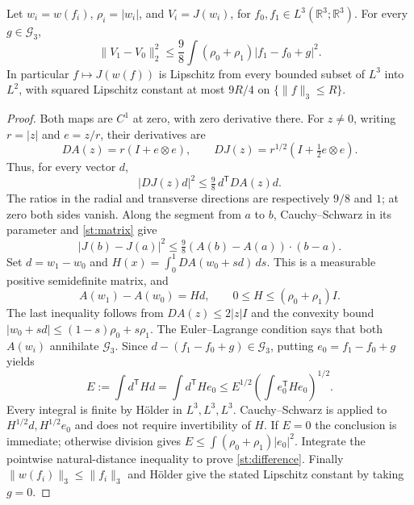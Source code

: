 \begin{theorem}\label{st:stability}
Let $w_i=w(f_i)$, $\rho_i=|w_i|$, and $V_i=J(w_i)$, for
$f_0,f_1\in L^3(\mathbb R^3;\mathbb R^3)$. For every $g\in\mathcal G_3$,
\begin{equation}\label{st:difference}
 \|V_1-V_0\|_2^2
 \le\frac98\int(\rho_0+\rho_1)|f_1-f_0+g|^2.
\end{equation}
In particular $f\mapsto J(w(f))$ is Lipschitz from every bounded subset
of $L^3$ into $L^2$, with squared Lipschitz constant at most $9R/4$
on $\{\|f\|_3\le R\}$.
\end{theorem}
\begin{proof}
Both maps are $C^1$ at zero, with zero derivative there. For $z\ne0$,
writing $r=|z|$ and $e=z/r$, their derivatives are
\[
 DA(z)=r(I+e\otimes e),\qquad
 DJ(z)=r^{1/2}(I+\tfrac12e\otimes e).
\]
Thus, for every vector $d$,
\begin{equation}\label{st:matrix}
 |DJ(z)d|^2\le\tfrac98\,d^{\mathsf T}DA(z)d.
\end{equation}
The ratios in the radial and transverse directions are respectively
$9/8$ and $1$; at zero both sides vanish. Along the segment from $a$ to
$b$, Cauchy--Schwarz in its parameter and \eqref{st:matrix} give
\[
 |J(b)-J(a)|^2\le\tfrac98
 (A(b)-A(a))\cdot(b-a).
\]
Set $d=w_1-w_0$ and
$H(x)=\int_0^1DA(w_0+s d)\,ds$. This is a measurable positive
semidefinite matrix, and
\[
 A(w_1)-A(w_0)=Hd,\qquad 0\le H\le(\rho_0+\rho_1)I.
\]
The last inequality follows from $DA(z)\le2|z|I$ and the convexity
bound $|w_0+s d|\le(1-s)\rho_0+s\rho_1$.
The Euler--Lagrange condition says that both $A(w_i)$ annihilate
$\mathcal G_3$. Since $d-(f_1-f_0+g)\in\mathcal G_3$, putting
$e_0=f_1-f_0+g$ yields
\[
 E:=\int d^{\mathsf T}Hd
   =\int d^{\mathsf T}He_0
   \le E^{1/2}\left(\int e_0^{\mathsf T}He_0\right)^{1/2}.
\]
Every integral is finite by H\"older in $L^3,L^3,L^3$.
Cauchy--Schwarz is applied to $H^{1/2}d,H^{1/2}e_0$ and does not
require invertibility of $H$. If $E=0$ the conclusion is immediate;
otherwise division gives $E\le\int(\rho_0+\rho_1)|e_0|^2$.
Integrate the pointwise natural-distance inequality to prove
\eqref{st:difference}. Finally $\|w(f_i)\|_3\le\|f_i\|_3$ and
H\"older give the stated Lipschitz constant by taking $g=0$.
\end{proof}

